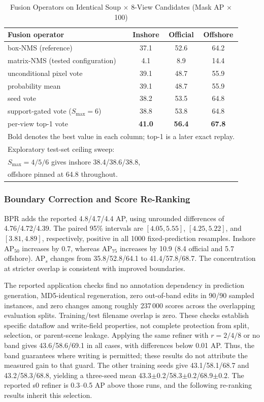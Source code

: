 \begin{table}[!t]
\caption{Fusion Operators on Identical Soup $\times$ 8-View Candidates (Mask AP $\times$100)}
\label{tab:fusion}
\centering
\setlength{\tabcolsep}{4pt}
\begin{tabular}{lccc}
\toprule
Fusion operator & Inshore & Official & Offshore \\
\midrule
box-NMS (reference) & 37.1 & 52.6 & 64.2 \\
matrix-NMS (tested configuration) & 4.1 & 8.9 & 14.4 \\
unconditional pixel vote & 39.1 & 48.7 & 55.9 \\
probability mean & 39.1 & 48.7 & 55.9 \\
seed vote & 38.2 & 53.5 & 64.8 \\
support-gated vote ($S_{\max}=6$) & 38.8 & 53.8 & 64.8 \\
per-view top-1 vote & \textbf{41.0} & \textbf{56.4} & \textbf{67.8} \\
\bottomrule
\multicolumn{4}{l}{\footnotesize Bold denotes the best value in each column; top-1 is a later exact replay.} \\
\multicolumn{4}{l}{\footnotesize Exploratory test-set ceiling sweep:} \\
\multicolumn{4}{l}{\footnotesize $S_{\max}=4/5/6$ gives inshore 38.4/38.6/38.8,} \\
\multicolumn{4}{l}{\footnotesize offshore pinned at 64.8 throughout.}
\end{tabular}
\end{table}


\subsubsection{Boundary Correction and Score Re-Ranking}\label{sec:exp:bpr}\label{sec:exp:rerank}
BPR adds the reported 4.8/4.7/4.4 AP, using unrounded differences of 4.76/4.72/4.39. The paired 95\% intervals are $[4.05,5.55]$, $[4.25,5.22]$, and $[3.81,4.89]$, respectively, positive in all 1000 fixed-prediction resamples. Inshore AP$_{50}$ increases by 0.7, whereas AP$_{75}$ increases by 10.9 (8.4 official and 5.7 offshore). AP$_s$ changes from 35.8/52.8/64.1 to 41.4/57.8/68.7. The concentration at stricter overlap is consistent with improved boundaries.

The reported application checks find no annotation dependency in prediction generation, MD5-identical regeneration, zero out-of-band edits in 90/90 sampled instances, and zero changes among roughly 237\,000 scores across the overlapping evaluation splits. Training/test filename overlap is zero. These checks establish specific dataflow and write-field properties, not complete protection from split, selection, or parent-scene leakage. Applying the same refiner with $r=2/4/8$ or no band gives 43.6/58.6/69.1 in all cases, with differences below 0.01 AP. Thus, the band guarantees where writing is permitted; these results do not attribute the measured gain to that guard. The other training seeds give 43.1/58.1/68.7 and 43.2/58.3/68.8, yielding a three-seed mean 43.3$\pm$0.2/58.3$\pm$0.2/68.9$\pm$0.2. The reported s0 refiner is 0.3--0.5 AP above those runs, and the following re-ranking results inherit this selection.

